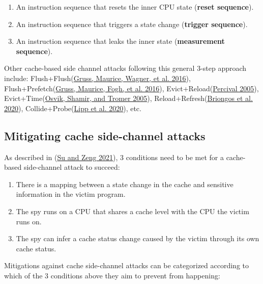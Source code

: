 \documentclass[
  a4paper,
]{report}
\providecommand{\tightlist}{%
  \setlength{\itemsep}{0pt}\setlength{\parskip}{0pt}}
\begin{document}
\begin{enumerate}
\def\labelenumi{\arabic{enumi}.}
\tightlist
\item
  An instruction sequence that resets the inner CPU state (\textbf{reset
  sequence}).
\item
  An instruction sequence that triggers a state change (\textbf{trigger
  sequence}).
\item
  An instruction sequence that leaks the inner state
  (\textbf{measurement sequence}).
\end{enumerate}

Other cache-based side channel attacks following this general 3-step
approach include:
Flush+Flush(\protect\hyperlink{ref-Gruss2016a}{Gruss,
Maurice, Wagner, et al. 2016}),
Flush+Prefetch(\protect\hyperlink{ref-Gruss2016}{Gruss,
Maurice, Fogh, et al. 2016}),
Evict+Reload(\protect\hyperlink{ref-Percival2005}{Percival
2005}),
Evict+Time(\protect\hyperlink{ref-Osvik2005}{Osvik,
Shamir, and Tromer 2005}),
Reload+Refresh(\protect\hyperlink{ref-Briongos2020}{Briongos
et al. 2020}),
Collide+Probe(\protect\hyperlink{ref-Lipp2020}{Lipp
et al. 2020}), etc.

\hypertarget{mitigating-cache-side-channel-attacks}{%
\subsection{Mitigating cache side-channel
attacks}\label{mitigating-cache-side-channel-attacks}}

As described in (\protect\hyperlink{ref-Su2021}{Su and Zeng 2021}), 3
conditions need to be met for a cache-based side-channel attack to
succeed:

\begin{enumerate}
\def\labelenumi{\arabic{enumi}.}
\tightlist
\item
  There is a mapping between a state change in the cache and sensitive
  information in the victim program.
\item
  The spy runs on a CPU that shares a cache level with the CPU the
  victim runs on.
\item
  The spy can infer a cache status change caused by the victim through
  its own cache status.
\end{enumerate}

Mitigations against cache side-channel attacks can be categorized
according to which of the 3 conditions above they aim to prevent from
happening:
\end{document}
